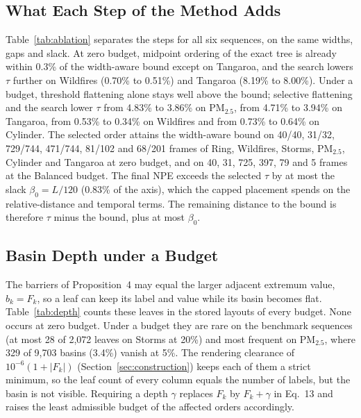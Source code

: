 \documentclass[preprint]{vgtc}
\begin{document}
\subsection{What Each Step of the Method Adds}\label{sec:increments}

Table~\ref{tab:ablation} separates the steps for all six sequences, on the same widths, gaps and slack. At zero budget, midpoint ordering of the exact tree is already within 0.3\% of the width-aware bound except on Tangaroa, and the search lowers $\tau$ further on Wildfires (0.70\% to 0.51\%) and Tangaroa (8.19\% to 8.00\%). Under a budget, threshold flattening alone stays well above the bound; selective flattening and the search lower $\tau$ from 4.83\% to 3.86\% on PM$_{2.5}$, from 4.71\% to 3.94\% on Tangaroa, from 0.53\% to 0.34\% on Wildfires and from 0.73\% to 0.64\% on Cylinder. The selected order attains the width-aware bound on 40/40, 31/32, 729/744, 471/744, 81/102 and 68/201 frames of Ring, Wildfires, Storms, PM$_{2.5}$, Cylinder and Tangaroa at zero budget, and on 40, 31, 725, 397, 79 and 5 frames at the Balanced budget. The final NPE exceeds the selected $\tau$ by at most the slack $\beta_0=L/120$ (0.83\% of the axis), which the capped placement spends on the relative-distance and temporal terms. The remaining distance to the bound is therefore $\tau$ minus the bound, plus at most $\beta_0$.

\subsection{Basin Depth under a Budget}\label{sec:basin-depth}

The barriers of Proposition~4 may equal the larger adjacent extremum value, $b_k=F_k$, so a leaf can keep its label and value while its basin becomes flat. Table~\ref{tab:depth} counts these leaves in the stored layouts of every budget. None occurs at zero budget. Under a budget they are rare on the benchmark sequences (at most 28 of 2,072 leaves on Storms at 20\%) and most frequent on PM$_{2.5}$, where 329 of 9,703 basins (3.4\%) vanish at 5\%. The rendering clearance of $10^{-6}(1+|F_k|)$ (Section~\ref{sec:construction}) keeps each of them a strict minimum, so the leaf count of every column equals the number of labels, but the basin is not visible. Requiring a depth $\gamma$ replaces $F_k$ by $F_k+\gamma$ in Eq.~13 and raises the least admissible budget of the affected orders accordingly.
\end{document}
